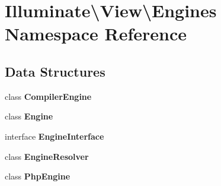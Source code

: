 \section{Illuminate\textbackslash{}View\textbackslash{}Engines Namespace Reference}
\label{namespace_illuminate_1_1_view_1_1_engines}
\subsection*{Data Structures}
\begin{DoxyCompactItemize}
\item 
class {\bf Compiler\+Engine}
\item 
class {\bf Engine}
\item 
interface {\bf Engine\+Interface}
\item 
class {\bf Engine\+Resolver}
\item 
class {\bf Php\+Engine}
\end{DoxyCompactItemize}
